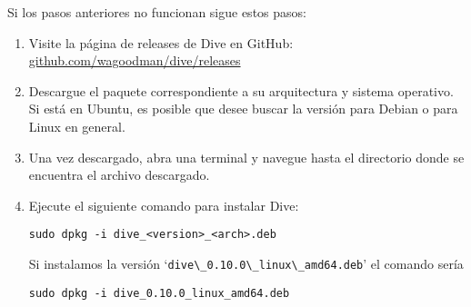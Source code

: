 \documentclass{article}
\begin{document}
Si los pasos anteriores no funcionan sigue estos pasos:
\begin{enumerate}
      \item Visite la página de releases de Dive en GitHub: \href{https://github.com/wagoodman/dive/releases}{github.com/wagoodman/dive/releases}
      \item Descargue el paquete correspondiente a su arquitectura y sistema operativo. Si está en Ubuntu, es posible que desee buscar la versión para Debian o para Linux en general.
      \item Una vez descargado, abra una terminal y navegue hasta el directorio donde se encuentra el archivo descargado.
      \item Ejecute el siguiente comando para instalar Dive:
      \begin{lstlisting}[numbers=none]
sudo dpkg -i dive_<version>_<arch>.deb           \end{lstlisting}
            Si instalamos la versión \enquote*{\lstinline{dive\_0.10.0\_linux\_amd64.deb}} el comando sería
            \begin{lstlisting}[numbers=none]
sudo dpkg -i dive_0.10.0_linux_amd64.deb         \end{lstlisting}
\end{enumerate}
\end{document}
